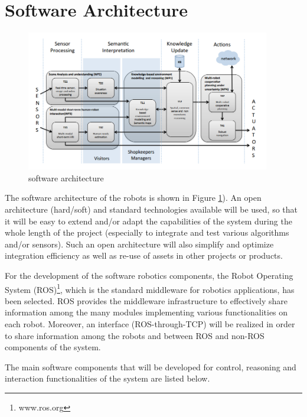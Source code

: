 \section{Software Architecture}

\begin{figure}
\centering
\includegraphics[width=0.95\textwidth]{fig/COACHES_swarch.png}
\caption{\coaches software architecture}
\label{fig:swarch}
\end{figure}

The software architecture of the \coaches robots is shown in Figure \ref{fig:swarch}).
An open architecture (hard/soft) and standard technologies available will be used, 
so that it will be easy to extend and/or adapt the capabilities of the system during the whole length of 
the  project  (especially  to  integrate  and  test  various  algorithms  and/or  sensors).  
Such an open architecture will also simplify and optimize integration efficiency as well as re-use of assets in other projects or products. 


For the development of the software robotics components, the Robot Operating System (ROS)\footnote{www.ros.org}, which is the standard middleware for robotics applications, has been selected.
ROS provides the middleware infrastructure to effectively share information among the many modules implementing various functionalities on each robot. Moreover, an interface (ROS-through-TCP) will be realized in order to share information among the robots and between ROS and non-ROS components of the system.

The main software components that will be developed for control, reasoning and interaction functionalities of the system are listed below.

